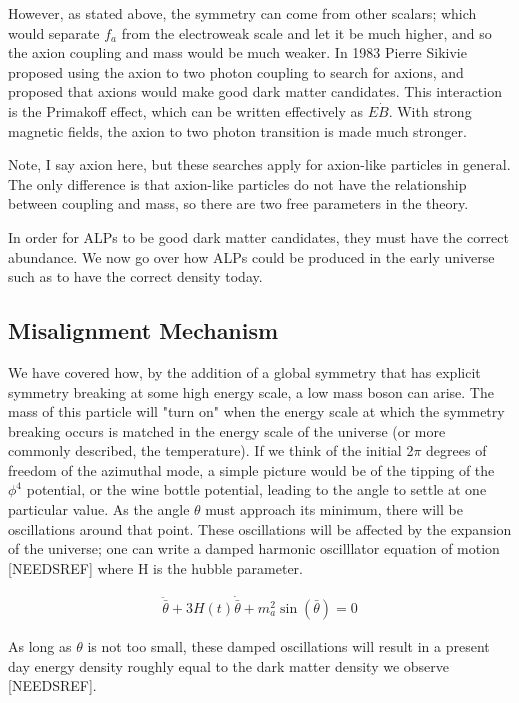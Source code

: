 \documentclass[12pt, twosides]{book}
\begin{document}
However, as stated above, the symmetry can come from other scalars; which would separate $f_a$ from the electroweak scale and let it be much higher, and so the axion coupling and mass would be much weaker. In 1983 Pierre Sikivie proposed using the axion to two photon coupling \cite{sikivie83} to search for axions, and proposed that axions would make good dark matter candidates. This interaction is the Primakoff effect, which can be written effectively as $E \dot B$. With strong magnetic fields, the axion to two photon transition is made much stronger.

Note, I say axion here, but these searches apply for axion-like particles in general. The only difference is that axion-like particles do not have the relationship between coupling and mass, so there are two free parameters in the theory.

In order for ALPs to be good dark matter candidates, they must have the correct abundance. We now go over how ALPs could be produced in the early universe such as to have the correct density today.

\subsection{Misalignment Mechanism}

We have covered how, by the addition of a global symmetry that has explicit symmetry breaking at some high energy scale, a low mass boson can arise. The mass of this particle will "turn on" when the energy scale at which the symmetry breaking occurs is matched in the energy scale of the universe (or more commonly described, the temperature). If we think of the initial 2$\pi$ degrees of freedom of the azimuthal mode, a simple picture would be of the tipping of the $\phi^4$ potential, or the wine bottle potential, leading to the angle to settle at one particular value. As the angle $\theta$ must approach its minimum, there will be oscillations around that point. These oscillations will be affected by the expansion of the universe; one can write a damped harmonic oscilllator equation of motion [NEEDSREF] where H is the hubble parameter.

\begin{align*}
\ddot \bar{\theta} + 3H(t)\dot \bar{\theta} + m_a^2\sin(\bar{\theta}) = 0
\end{align*}

As long as $\theta$ is not too small, these damped oscillations will result in a present day energy density roughly equal to the dark matter density we observe [NEEDSREF].
\end{document}
